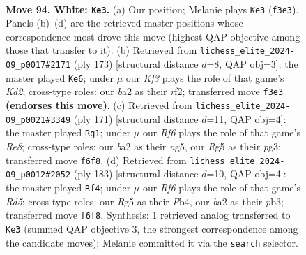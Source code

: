 \documentclass[11pt]{article}
\begin{document}
\clearpage

\begin{figure}[p]\centering
\begin{subfigure}{0.46\textwidth}\centering
\resizebox{\linewidth}{!}{%
\newchessgame
\chessboard[
  setfen={8/3k4/1P3R2/6R1/7r/5K2/b7/8 w - - 7 94},
  showmover=false,
  pgfstyle=straightmove, color=movearrow, markmove={f3-e3}
]}
\caption{}
\end{subfigure}\hfill
\begin{subfigure}{0.46\textwidth}\centering
\resizebox{\linewidth}{!}{%
\newchessgame
\chessboard[
  setfen={8/3k4/8/1K6/3r3p/8/5R2/8 b - - 0 87},
  showmover=false,
  pgfstyle=straightmove, color=movearrow, markmove={d7-e6}
]}
\caption{}
\end{subfigure}
\\[4pt]
\begin{subfigure}{0.46\textwidth}\centering
\resizebox{\linewidth}{!}{%
\newchessgame
\chessboard[
  setfen={8/4k3/2R5/5pN1/8/3K2P1/8/4r3 b - - 0 86},
  showmover=false,
  pgfstyle=straightmove, color=movearrow, markmove={e1-g1}
]}
\caption{}
\end{subfigure}\hfill
\begin{subfigure}{0.46\textwidth}\centering
\resizebox{\linewidth}{!}{%
\newchessgame
\chessboard[
  setfen={8/3k4/8/2R5/1p1r4/1P6/8/2K5 b - - 18 92},
  showmover=false,
  pgfstyle=straightmove, color=movearrow, markmove={d4-f4}
]}
\caption{}
\end{subfigure}
\caption{\textbf{Move 94, White: \texttt{Ke3}.} (a) Our position; Melanie plays \texttt{Ke3} (\texttt{f3e3}). Panels (b)--(d) are the retrieved master positions whose correspondence most drove this move (highest QAP objective among those that transfer to it). (b) Retrieved from \texttt{lichess\_elite\_2024-09\_p0017\#2171} (ply 173) [structural distance $d$=8, QAP obj=3]: the master played \texttt{Ke6}; under $\mu$ our \emph{Kf3} plays the role of that game's \emph{Kd2}; cross-type roles: our \emph{b}a2 as their \emph{r}f2; transferred move \texttt{f3e3} \textbf{(endorses this move)}. (c) Retrieved from \texttt{lichess\_elite\_2024-09\_p0021\#3349} (ply 171) [structural distance $d$=11, QAP obj=4]: the master played \texttt{Rg1}; under $\mu$ our \emph{Rf6} plays the role of that game's \emph{Re8}; cross-type roles: our \emph{b}a2 as their \emph{n}g5, our \emph{R}g5 as their \emph{p}g3; transferred move \texttt{f6f8}. (d) Retrieved from \texttt{lichess\_elite\_2024-09\_p0012\#2052} (ply 183) [structural distance $d$=10, QAP obj=4]: the master played \texttt{Rf4}; under $\mu$ our \emph{Rf6} plays the role of that game's \emph{Rd5}; cross-type roles: our \emph{R}g5 as their \emph{P}b4, our \emph{b}a2 as their \emph{p}b3; transferred move \texttt{f6f8}. Synthesis: 1 retrieved analog transferred to \texttt{Ke3} (summed QAP objective 3, the strongest correspondence among the candidate moves); Melanie committed it via the \texttt{search} selector.}
\label{fig:thought-m186}
\end{figure}
\end{document}
